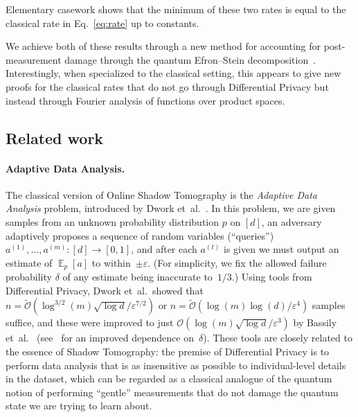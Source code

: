 \documentclass[10pt]{article}
\newcommand{\eps}{\epsilon}
\newcommand{\wt}[1]{\widetilde{#1}}
\renewcommand{\epsilon}{\varepsilon}
\DeclareMathOperator*{\EE}{\mathbb{E}}
\newcommand{\sitan}[1]{{\color{red}[sitan: #1]}}
\newcommand{\ryan}[1]{{\color{purple}[ryan: #1]}}
\renewcommand{\sitan}[1]{}
\renewcommand{\ryan}[1]{}
\begin{document}
\noindent Elementary casework shows that the minimum of these two rates is equal to the classical rate in Eq.~\eqref{eq:rate} up to constants. 

We achieve both of these results through a new method for accounting for post-measurement damage through the quantum Efron--Stein decomposition~\cite{pickl2011simple,de2025non}. Interestingly, when specialized to the classical setting, this appears to give new proofs for the classical rates that do not go through Differential Privacy but instead through Fourier analysis of functions over product spaces.

\subsection{Related work}

\paragraph{Adaptive Data Analysis.}  The classical version of Online Shadow Tomography is the \emph{Adaptive Data Analysis} problem, introduced by Dwork et~al.~\cite{DFHPRR16}.  In this problem, we are given samples from an unknown probability distribution $p$ on $[d]$, an adversary adaptively proposes a sequence of random variables (``queries'') 
$a^{(1)}, \ldots, a^{(m)} : [d] \to [0,1]$, and after each $a^{(t)}$ is given we must output an estimate of $\EE_p[a]$ to within~$\pm \eps$.  (For simplicity, we fix the allowed failure probability $\delta$ of any estimate being inaccurate to~$1/3$.)  Using tools from Differential Privacy,
Dwork et~al.\ showed that $n = \wt{\mathcal{O}}(\log^{3/2}(m) \sqrt{\log d}/\eps^{7/2})$ or $n = \wt{\mathcal{O}}(\log(m) \log(d)/\eps^{4})$ samples suffice, and these were improved to just $\mathcal{O}(\log(m) \sqrt{\log d}/\eps^3)$ by Bassily et~al.~\cite{bassily2021algorithmic} (see~\cite{CLNSS23} for an improved dependence on~$\delta$). These tools are closely related to the essence of Shadow Tomography: the premise of Differential Privacy is to perform data analysis that is as insensitive as possible to individual-level details in the dataset, which can be regarded as a classical analogue of the quantum notion of performing ``gentle'' measurements that do not damage the quantum state we are trying to learn about.
\end{document}
